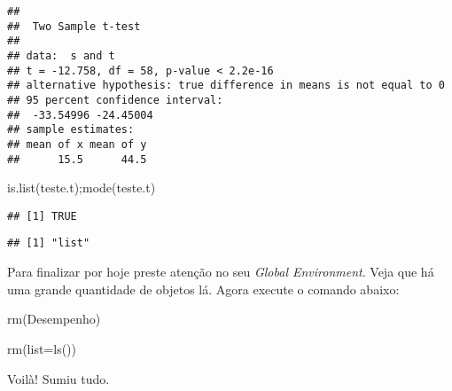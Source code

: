 \documentclass[
]{book}
\newenvironment{Shaded}{\begin{snugshade}}{\end{snugshade}}
\newcommand{\AttributeTok}[1]{\textcolor[rgb]{0.77,0.63,0.00}{#1}}
\newcommand{\FunctionTok}[1]{\textcolor[rgb]{0.00,0.00,0.00}{#1}}
\newcommand{\NormalTok}[1]{#1}
\begin{document}
\begin{verbatim}
## 
##  Two Sample t-test
## 
## data:  s and t
## t = -12.758, df = 58, p-value < 2.2e-16
## alternative hypothesis: true difference in means is not equal to 0
## 95 percent confidence interval:
##  -33.54996 -24.45004
## sample estimates:
## mean of x mean of y 
##      15.5      44.5
\end{verbatim}

\begin{Shaded}
\begin{Highlighting}[]
\FunctionTok{is.list}\NormalTok{(teste.t);}\FunctionTok{mode}\NormalTok{(teste.t)}
\end{Highlighting}
\end{Shaded}

\begin{verbatim}
## [1] TRUE
\end{verbatim}

\begin{verbatim}
## [1] "list"
\end{verbatim}

Para finalizar por hoje preste atenção no seu \emph{Global Environment}.
Veja que há uma grande quantidade de objetos lá. Agora execute o comando abaixo:

\begin{Shaded}
\begin{Highlighting}[]
\FunctionTok{rm}\NormalTok{(Desempenho)}

\FunctionTok{rm}\NormalTok{(}\AttributeTok{list=}\FunctionTok{ls}\NormalTok{())}
\end{Highlighting}
\end{Shaded}

Voilà! Sumiu tudo.

  
\end{document}
